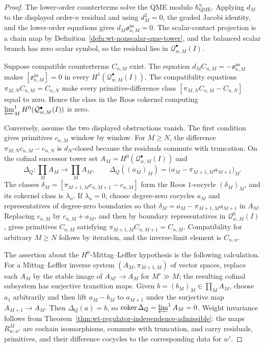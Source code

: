 \begin{proof}
  The lower-order counterterms solve the QME modulo \(\hbar_{\mathrm{QME}}^n\).  Applying
  \(d_M\) to the displayed order-\(n\) residual and using
  \(d_M^2=0\), the graded Jacobi identity, and the lower-order equations
  gives \(d_M\mathfrak o^{\mathrm{ns}}_{n,M}=0\).  The scalar-contact
  projection is a chain map by
  Definition~\ref{defn:wt-nonscalar-qme-tower}, and the balanced scalar
  branch has zero scalar symbol, so the residual lies in
  \(\mathcal Q^\bullet_{w,M}(I)\).

  Suppose compatible counterterms \(C_{n,M}\) exist.  The equation
  \(d_MC_{n,M}=-\mathfrak o^{\mathrm{ns}}_{n,M}\) makes
  \([\mathfrak o^{\mathrm{ns}}_{n,M}]=0\) in every
  \(H^1(\mathcal Q^\bullet_{w,M}(I))\).  The compatibility equations
  \(\pi_{M,N}C_{n,M}=C_{n,N}\) make every primitive-difference class
  \([\pi_{M,N}C_{n,M}-C_{n,N}]\) equal to zero.  Hence the class in the
  Roos cokernel computing
  \(\varprojlim^1_MH^0(\mathcal Q^\bullet_{w,M}(I))\) is zero.

  Conversely, assume the two displayed obstructions vanish.  The first
  condition gives primitives \(c_{n,M}\) window by window.  For
  \(M\geq N\), the difference
  \(\pi_{M,N}c_{n,M}-c_{n,N}\) is \(d_N\)-closed because the residuals
  commute with truncation.  On the cofinal successor tower set
  \(A_M=H^0(\mathcal Q^\bullet_{w,M}(I))\) and
  \[
    \Delta_Q\colon\prod_M A_M\longrightarrow\prod_M A_M,\qquad
    \Delta_Q((a_M)_M)
      =\bigl(a_M-\pi_{M+1,M}a_{M+1}\bigr)_M .
  \]
  The classes
  \(\delta_M=[\pi_{M+1,M}c_{n,M+1}-c_{n,M}]\) form the Roos
  \(1\)-cocycle \((\delta_M)_M\), and its cokernel class is
  \(\lambda_n\).  If \(\lambda_n=0\), choose degree-zero cocycles
  \(a_M\) and representatives of degree-zero boundaries so that
  \(\delta_M=a_M-\pi_{M+1,M}a_{M+1}\) in \(A_M\).  Replacing
  \(c_{n,M}\) by \(c_{n,M}+a_M\), and then by boundary representatives
  in \(\mathcal Q^0_{w,M}(I)\), gives primitives \(C_{n,M}\) satisfying
  \(\pi_{M+1,M}C_{n,M+1}=C_{n,M}\).  Compatibility for arbitrary
  \(M\geq N\) follows by iteration, and the inverse-limit element is
  \(C_{n,w}\).

  The assertion about the \(H^0\)-Mittag--Leffler hypothesis is the
  following calculation.  For a Mittag--Leffler inverse system
  \((A_M,\pi_{M+1,M})\) of vector spaces, replace each \(A_M\) by the
  stable image of \(A_{M'}\to A_M\) for \(M'\gg M\); the resulting
  cofinal subsystem has surjective transition maps.  Given
  \(b=(b_M)_M\in\prod_M A_M\), choose \(a_1\) arbitrarily and then lift
  \(a_M-b_M\) to \(a_{M+1}\) under the surjective map
  \(A_{M+1}\to A_M\).  Then \(\Delta_Q(a)=b\), so
  \(\operatorname{coker}\Delta_Q=\varprojlim^1 A_M=0\).
  Weight invariance follows from
  Theorem~\ref{thm:wt-regulator-independence-admissible}: the maps
  \(R^M_{w,w'}\) are cochain isomorphisms, commute with truncation, and
  carry residuals, primitives, and their difference cocycles to the
  corresponding data for \(w'\).
\end{proof}

